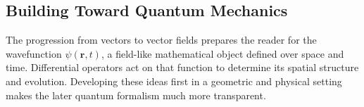 \subsection*{Building Toward Quantum Mechanics}

The progression from vectors to vector fields prepares the reader for the
wavefunction $\psi(\mathbf r,t)$, a field-like mathematical object defined over
space and time. Differential operators act on that function to determine its
spatial structure and evolution. Developing these ideas first in a geometric
and physical setting makes the later quantum formalism much more transparent.
